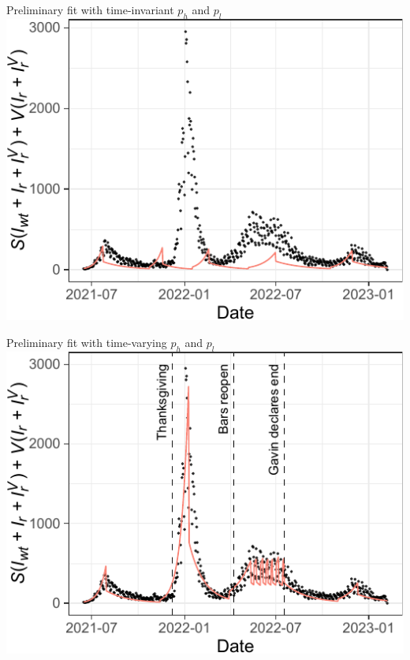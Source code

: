 \documentclass[
  11pt,
  ignorenonframetext,
]{beamer}
\begin{document}
\begin{frame}{Preliminary fit with time-invariant \(p_h\) and \(p_l\)}
\protect\hypertarget{preliminary-fit-with-time-invariant-p_h-and-p_l}{}
\includegraphics{interim_files/figure-beamer/unnamed-chunk-2-1.pdf}
\end{frame}

\begin{frame}{Preliminary fit with time-varying \(p_h\) and \(p_l\)}
\protect\hypertarget{preliminary-fit-with-time-varying-p_h-and-p_l}{}
\includegraphics{interim_files/figure-beamer/unnamed-chunk-4-1.pdf}
\end{frame}
\end{document}
